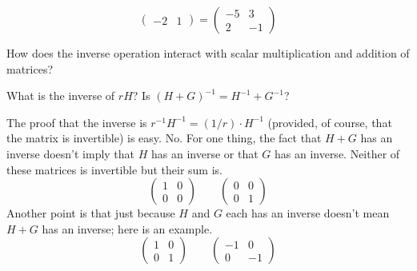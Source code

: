 \begin{exercises}
\begin{answer}
\begin{equation*}
\begin{pmatrix}
          -2  &1
         \end{pmatrix}
         =\begin{pmatrix}
           -5  &3  \\
            2  &-1
         \end{pmatrix}
       \end{equation*}  
      \end{answer}
  \item 
   How does the inverse operation interact with scalar multiplication 
   and addition of matrices? 
   \begin{exparts}
      \partsitem What is the inverse of \( rH \)?
      \partsitem Is \( (H+G)^{-1}=H^{-1}+G^{-1} \)?
    \end{exparts}
    \begin{answer}
      \begin{exparts}
        \partsitem The proof that the inverse is 
          \( r^{-1}H^{-1}=(1/r)\cdot H^{-1} \) 
          (provided, of course, that the matrix is invertible) is easy.
        \partsitem No.
          For one thing, the fact that $H+G$ has an inverse doesn't imply that
          $H$ has an inverse or that $G$ has an inverse.
          Neither of these matrices is invertible but their sum is.
          \begin{equation*}
            \begin{pmatrix}
              1  &0  \\
              0  &0
            \end{pmatrix}
            \qquad
            \begin{pmatrix}
              0  &0  \\
              0  &1
            \end{pmatrix}
          \end{equation*}
          Another point is that just because $H$ and $G$ each has an inverse
          doesn't mean $H+G$ has an inverse; here is an example.
          \begin{equation*}
            \begin{pmatrix}
              1  &0  \\
              0  &1
            \end{pmatrix}
            \qquad
            \begin{pmatrix}
              -1  &0  \\
               0  &-1
            \end{pmatrix}
          \end{equation*}

\end{exparts}
\end{answer}
\end{exercises}

